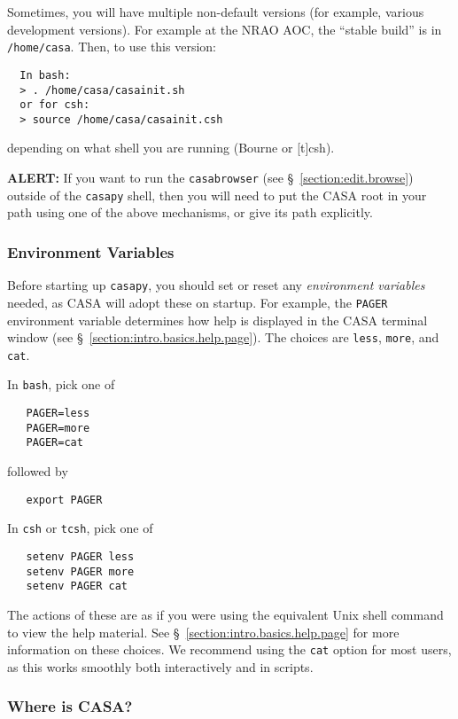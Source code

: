 Sometimes, you will have multiple non-default
versions (for example, various development versions).  For example at the
NRAO AOC, the ``stable build'' is in {\tt /home/casa}.
Then, to use this version:
\small
\begin{verbatim}
  In bash:
  > . /home/casa/casainit.sh
  or for csh:
  > source /home/casa/casainit.csh
\end{verbatim}
\normalsize
depending on what shell you are running (Bourne or [t]csh). 

{\bf ALERT:} If you want to run the {\tt casabrowser}
(see \S~\ref{section:edit.browse}) outside of the {\tt casapy}
shell, then you will need to put the CASA root in
your path using one of the above mechanisms, or give its path
explicitly.

\subsubsection{Environment Variables}
\label{section:intro.basics.before.env}

Before starting up {\tt casapy}, you should set or reset any
{\it environment variables} needed, as CASA will adopt these on startup.  For
example, the {\tt PAGER} environment variable determines how help is
displayed in the CASA terminal window (see
\S~\ref{section:intro.basics.help.page}).  The choices are {\tt less},
{\tt more}, and {\tt cat}.

In {\tt bash}, pick one of
\small
\begin{verbatim}
   PAGER=less
   PAGER=more
   PAGER=cat
\end{verbatim}
\normalsize
followed by
\small
\begin{verbatim}
   export PAGER
\end{verbatim}
\normalsize

In {\tt csh} or {\tt tcsh}, pick one of
\small
\begin{verbatim}
   setenv PAGER less
   setenv PAGER more
   setenv PAGER cat
\end{verbatim}
\normalsize
The actions of these are as if you were using the equivalent Unix
shell command to view the help material.  See
\S~\ref{section:intro.basics.help.page} for more information on these
choices.
We recommend using the {\tt cat} option for most users, as this works
smoothly both interactively and in scripts.

\subsubsection{Where is CASA?}
\label{section:intro.basics.before.path}

